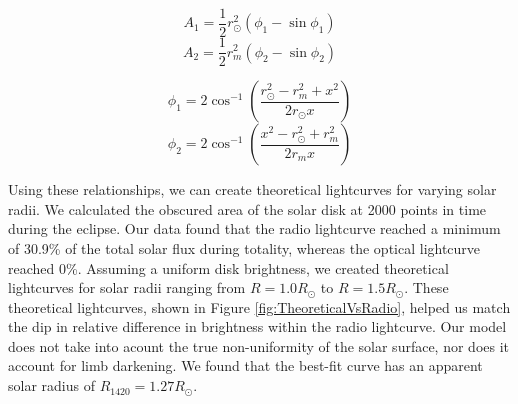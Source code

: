 \begin{equation}
  A_1 = \frac{1}{2}r_{\odot}^2\left(\phi_1 - \sin\phi_1\right)
\end{equation}
\begin{equation}
  A_2 = \frac{1}{2}r_{m}^2\left(\phi_2 - \sin\phi_2\right)
\end{equation}

\begin{equation}
  \phi_1 = 2\cos^{-1}\left(\frac{r_{\odot}^2 - r_{m}^2+x^2}{2r_{\odot}x}\right)
\end{equation}
\begin{equation}
  \phi_2 = 2\cos^{-1}\left(\frac{x^2 - r_{\odot}^2 + r_{m}^2}{2r_{m}x}\right)
\end{equation}

Using these relationships, we can create theoretical lightcurves for varying solar radii.
We calculated the obscured area of the solar disk at 2000 points in time during the eclipse.
Our data found that the radio lightcurve reached a minimum of 30.9\% of the total solar flux during totality, whereas the optical lightcurve reached 0\%.
Assuming a uniform disk brightness, we created theoretical lightcurves for solar radii ranging from $R = 1.0 R_{\odot}$ to $R = 1.5 R_{\odot}$.
These theoretical lightcurves, shown in Figure \ref{fig:TheoreticalVsRadio}, helped us match the dip in relative difference in brightness within the radio lightcurve.
Our model does not take into acount the true non-uniformity of the solar surface, nor does it account for limb darkening.
We found that the best-fit curve has an apparent solar radius of $R_{\mathrm{1420}} = 1.27 R_{\odot}$.